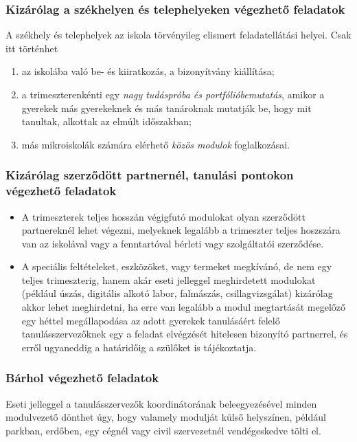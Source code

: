 \subsubsection{Kizárólag a székhelyen és telephelyeken végezhető feladatok}
A székhely és telephelyek az iskola törvényileg elismert feladatellátási helyei. Csak itt történhet
\begin{enumerate}
    \item az iskolába való be- és kiiratkozás, a bizonyítvány kiállítása;
    \item a trimeszterenkénti egy \emph{nagy tudáspróba és portfólióbemutatás}, amikor a gyerekek más gyerekeknek és más tanároknak mutatják be, hogy mit tanultak, alkottak az elmúlt időszakban;
    \item  más mikroiskolák számára elérhető \emph{közös modulok} foglalkozásai.
\end{enumerate}

\subsubsection{Kizárólag szerződött partnernél, tanulási pontokon végezhető feladatok}
\begin{itemize}
    \item A trimeszterek teljes hosszán végigfutó modulokat olyan szerződött partnereknél lehet végezni, melyeknek legalább a trimeszter teljes hosz\-szára van az iskolával vagy a fenntartóval bérleti vagy szolgáltatói szerződése.
    \item A speciális feltételeket, eszközöket, vagy termeket megkívánó, de nem egy teljes trimeszterig, hanem akár eseti jelleggel meghirdetett modulokat (például úszás, digitális alkotó labor, falmászás, csillagvizsgálat) kizárólag akkor lehet meghirdetni, ha erre van legalább a modul megtartását megelőző egy héttel megállapodása az adott gyerekek tanulásáért felelő tanulásszervezőknek egy a feladat elvégzését hitelesen bizonyító partnerrel, és erről ugyaneddig a határidőig a szülőket is tájékoztatja.
\end{itemize}

\subsubsection{Bárhol végezhető feladatok}

Eseti jelleggel a tanulásszervezők koordinátorának beleegyezésével minden modulvezető dönthet úgy, hogy valamely modulját külső helyszínen, például parkban, erdőben, egy cégnél vagy civil szervezetnél vendégeskedve tölti el.

